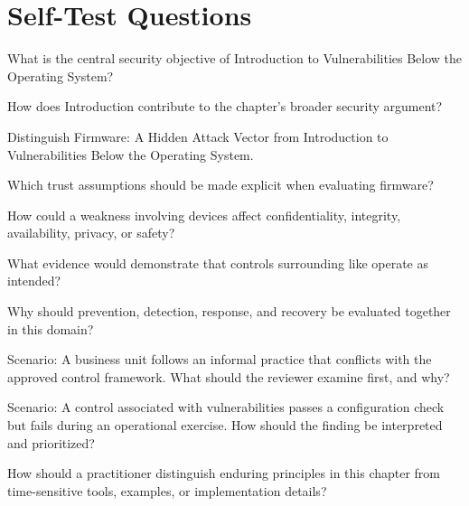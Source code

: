 \documentclass[11pt,letterpaper]{article}
\begin{document}
\section*{Self-Test Questions}
\begin{CornellRecallList}
\item What is the central security objective of Introduction to Vulnerabilities Below the Operating System?
\item How does Introduction contribute to the chapter's broader security argument?
\item Distinguish Firmware: A Hidden Attack Vector from Introduction to Vulnerabilities Below the Operating System.
\item Which trust assumptions should be made explicit when evaluating firmware?
\item How could a weakness involving devices affect confidentiality, integrity, availability, privacy, or safety?
\item What evidence would demonstrate that controls surrounding like operate as intended?
\item Why should prevention, detection, response, and recovery be evaluated together in this domain?
\item Scenario: A business unit follows an informal practice that conflicts with the approved control framework. What should the reviewer examine first, and why?
\item Scenario: A control associated with vulnerabilities passes a configuration check but fails during an operational exercise. How should the finding be interpreted and prioritized?
\item How should a practitioner distinguish enduring principles in this chapter from time-sensitive tools, examples, or implementation details?
\end{CornellRecallList}
\end{document}
